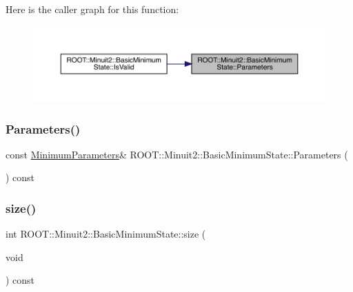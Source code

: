 Here is the caller graph for this function\+:\nopagebreak
\begin{figure}[H]
\begin{center}
\leavevmode
\includegraphics[width=350pt]{d0/db1/classROOT_1_1Minuit2_1_1BasicMinimumState_a0b72fce84557374c989a6581711e6e6a_icgraph}
\end{center}
\end{figure}
\mbox{\label{classROOT_1_1Minuit2_1_1BasicMinimumState_a0b72fce84557374c989a6581711e6e6a}} 
\subsubsection{\texorpdfstring{Parameters()}{Parameters()}\hspace{0.1cm}{\footnotesize\ttfamily [2/2]}}
{\footnotesize\ttfamily const \mbox{\hyperlink{classROOT_1_1Minuit2_1_1MinimumParameters}{Minimum\+Parameters}}\& R\+O\+O\+T\+::\+Minuit2\+::\+Basic\+Minimum\+State\+::\+Parameters (\begin{DoxyParamCaption}{ }\end{DoxyParamCaption}) const\hspace{0.3cm}{\ttfamily [inline]}}

\mbox{\label{classROOT_1_1Minuit2_1_1BasicMinimumState_a12c3b0b51b127384c53029c54c984590}} 
\subsubsection{\texorpdfstring{size()}{size()}\hspace{0.1cm}{\footnotesize\ttfamily [1/2]}}
{\footnotesize\ttfamily int R\+O\+O\+T\+::\+Minuit2\+::\+Basic\+Minimum\+State\+::size (\begin{DoxyParamCaption}\item[{void}]{ }\end{DoxyParamCaption}) const\hspace{0.3cm}{\ttfamily [inline]}}

